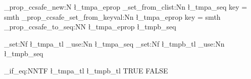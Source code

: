 \documentclass{article}
\begin{document}
\ExplSyntaxOn
\erw_prop_ccsafe_new:N \l_tmpa_eprop
\seq_set_from_clist:Nn \l_tmpa_seq { key = smth }
\erw_prop_ccsafe_set_from_keyval:Nn \l_tmpa_eprop { key = smth }
\erw_prop_ccsafe_to_seq:NN \l_tmpa_eprop \l_tmpb_seq

\tl_set:Nf \l_tmpa_tl { \seq_use:Nn \l_tmpa_seq { } }
\tl_set:Nf \l_tmpb_tl { \seq_use:Nn \l_tmpb_seq { } }

\tl_if_eq:NNTF \l_tmpa_tl \l_tmpb_tl { TRUE } { FALSE }
\ExplSyntaxOff
\end{document}
